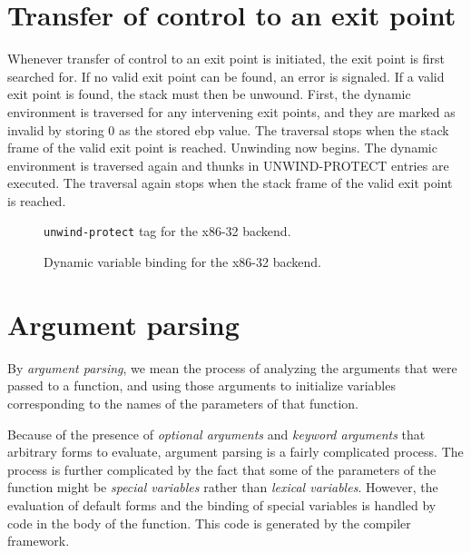 \section{Transfer of control to an exit point}

Whenever transfer of control to an exit point is initiated, the exit
point is first searched for.  If no valid exit point can be found, an
error is signaled.  If a valid exit point is found, the stack must
then be unwound.  First, the dynamic environment is traversed for any
intervening exit points, and they are marked as invalid by storing 0
as the stored ebp value.  The traversal stops when the stack frame of
the valid exit point is reached.  Unwinding now begins.  The dynamic
environment is traversed again and thunks in UNWIND-PROTECT entries
are executed.  The traversal again stops when the stack frame of the
valid exit point is reached.

\begin{figure}
\begin{center}
\end{center}
\caption{\label{fig-x86-32-unwind-protect}
\texttt{unwind-protect} tag for the x86-32 backend.}
\end{figure}

\begin{figure}
\begin{center}
\end{center}
\caption{\label{fig-x86-32-dynamic-binding}
Dynamic variable binding for the x86-32 backend.}
\end{figure}

\section{Argument parsing}

By \emph{argument parsing}, we mean the process of analyzing the
arguments that were passed to a function, and using those arguments to
initialize variables corresponding to the names of the parameters of
that function.

Because of the presence of \emph{optional arguments} and \emph{keyword
  arguments} that arbitrary forms to evaluate, argument parsing is a
fairly complicated process.  The process is further complicated by the
fact that some of the parameters of the function might be
\emph{special variables} rather than \emph{lexical variables}.
However, the evaluation of default forms and the binding of special
variables is handled by code in the body of the function.  This code
is generated by the \cleavir{} compiler framework.

